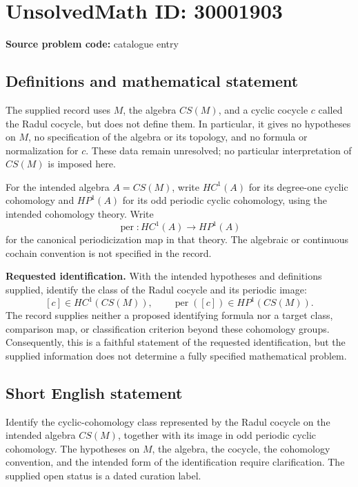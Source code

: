 \documentclass[11pt]{article}
\begin{document}
\section*{UnsolvedMath ID: 30001903}
\textbf{Source problem code:} catalogue entry
\subsection{Definitions and mathematical statement}
The supplied record uses \(M\), the algebra \(CS(M)\), and a cyclic cocycle \(c\) called the Radul cocycle, but does not define them. In particular, it gives no hypotheses on \(M\), no specification of the algebra or its topology, and no formula or normalization for \(c\). These data remain unresolved; no particular interpretation of \(CS(M)\) is imposed here.

For the intended algebra \(A=CS(M)\), write \(HC^1(A)\) for its degree-one cyclic cohomology and \(HP^1(A)\) for its odd periodic cyclic cohomology, using the intended cohomology theory. Write
\[
\operatorname{per}\colon HC^1(A)\longrightarrow HP^1(A)
\]
for the canonical periodicization map in that theory. The algebraic or continuous cochain convention is not specified in the record.

\textbf{Requested identification.} With the intended hypotheses and definitions supplied, identify the class of the Radul cocycle and its periodic image:
\[
[c]\in HC^1(CS(M)),
\qquad
\operatorname{per}([c])\in HP^1(CS(M)).
\]
The record supplies neither a proposed identifying formula nor a target class, comparison map, or classification criterion beyond these cohomology groups. Consequently, this is a faithful statement of the requested identification, but the supplied information does not determine a fully specified mathematical problem.
\subsection{Short English statement}
Identify the cyclic-cohomology class represented by the Radul cocycle on the intended algebra \(CS(M)\), together with its image in odd periodic cyclic cohomology. The hypotheses on \(M\), the algebra, the cocycle, the cohomology convention, and the intended form of the identification require clarification. The supplied open status is a dated curation label.
\end{document}
